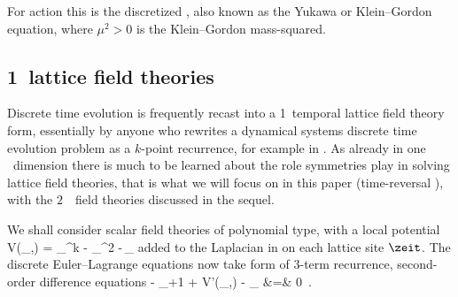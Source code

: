 For action  this is the discretized
{\sPe}, also known as the {Yukawa} or Klein–Gordon
equation, where  ${\mu}^2>0$ is the Klein–\-Gordon mass-squared.

\subsection{1\dmn\ lattice field theories}
\label{s:LC21FT1d}

Discrete time evolution is frequently recast into a 1\dmn\ temporal
lattice field theory form, essentially by anyone who rewrites a
dynamical systems discrete time evolution problem as a $k$-point recurrence,
for example in
.
As already in one \spt\ dimension there is much to be learned about the
role symmetries play in solving lattice field theories, that is what we
will focus on in this paper (time-reversal
), with the $2$\dmn\ \spt\ field
theories discussed in the sequel.

We shall consider scalar field theories of polynomial type, with a local
potential%
\beq
V(\ssp_\zeit,\Ssym{\zeit}) =  \ssp_{\zeit}^k
                            - \ssp_{\zeit}^2 -\Ssym{\zeit}\,\ssp_\zeit
{}
added to the Laplacian in  on each lattice
site $\zeit$. The discrete Euler–Lagrange equations 
now take form of 3-term recurrence, second-order difference equations
\bea
- \ssp_{\zeit+1} + V'(\ssp_\zeit,\Ssym{\zeit}) - \ssp_{}
    &=&
0  %
\,.  %
\label{LC21:1dTempFT}%
\eea

